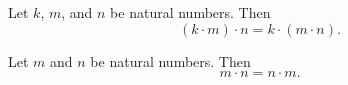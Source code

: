 \begin{proposition}[Associativity]
Let $k$, $m$, and $n$ be natural numbers. Then
\[
(k \cdot  m) \cdot  n = k \cdot  (m \cdot  n).
\]
\end{proposition}

\begin{proposition}
Let $m$ and $n$ be natural numbers. Then
\[
m \cdot  n = n \cdot  m.
\]
\end{proposition}


